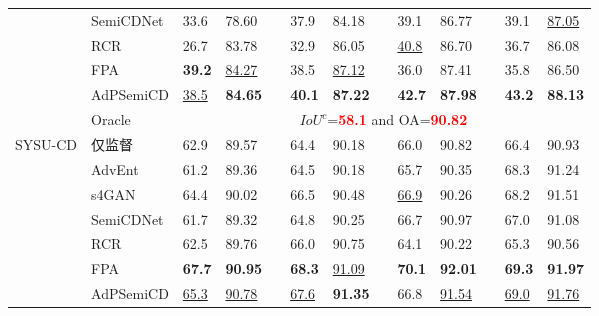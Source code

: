 \documentclass[lang=chs, degree=master, blindreview=false, adobe=false]{yanputhesis}
\begin{document}
\begin{table}[H]
{\begin{tabular}{p{20mm}p{25mm}p{8mm}p{8mm}cp{8mm}p{8mm}cp{8mm}p{8mm}cp{8mm}p{8mm}}
      & SemiCDNet\cite{peng2021SemiCDNet} & 33.6 & 78.60 && 37.9 & 84.18 && 39.1 & 86.77 && 39.1 & \underline{87.05} \\ %
      & RCR\cite{bandara2022RCR}& 26.7 & 83.78 && 32.9 & 86.05 && \underline{40.8} & 86.70 && 36.7 & 86.08 \\
      & FPA\cite{Zhang2023FPA}& \cellcolor{mycyan}\textbf{39.2} & \underline{84.27} && 38.5 & \underline{87.12} && 36.0 & 87.41 && 35.8 & 86.50 \\
      \rowcolor{mycyan}
      \multirow{-8}{*}{\cellcolor{white}}& \cellcolor{white}AdPSemiCD   &   \cellcolor{white}\underline{38.5} & \textbf{84.65} && \textbf{40.1} & \textbf{87.22} && \textbf{42.7} & \textbf{87.98} && \cellcolor{mycyan}\textbf{43.2} & \cellcolor{mycyan}\textbf{88.13} \\%
      \cline{2-13}
      & Oracle & \multicolumn{11}{c}{$ IoU^c$=\textcolor{red}{\bf 58.1} and OA=\textcolor{red}{\bf 90.82}} \\
      \bottomrule
      \multirow{8}{*}{SYSU-CD}
      & 仅监督   &   62.9 & 89.57 && 64.4 & 90.18 && 66.0 & 90.82 && 66.4 & 90.93 \\ %
      & AdvEnt\cite{vu2019advent}& 61.2 & 89.36 && 64.5 & 90.18 && 65.7 & 90.35 && 68.3 & 91.24 \\ %
      & s4GAN\cite{mittal2019semi}& 64.4 & 90.02 && 66.5 & 90.48 && \cellcolor{white}\underline{66.9} & 90.26 && 68.2 & 91.51 \\
      & SemiCDNet\cite{peng2021SemiCDNet} & 61.7 & 89.32 && 64.8 & 90.25 && 66.7 & 90.97 && 67.0 & 91.08 \\ %
      & RCR\cite{bandara2022RCR}& 62.5 & 89.76 && 66.0 & 90.75 && 64.1 & 90.22 && 65.3 & 90.56 \\
      & FPA\cite{Zhang2023FPA}& \cellcolor{mycyan}\textbf{67.7} &\cellcolor{mycyan}\textbf{90.95} &\cellcolor{mycyan}& \cellcolor{mycyan}\textbf{68.3} & \underline{91.09} && \cellcolor{mycyan}\textbf{70.1} & \cellcolor{mycyan}\textbf{92.01} &\cellcolor{mycyan}& \cellcolor{mycyan}\textbf{69.3} & \cellcolor{mycyan}\textbf{91.97} \\
      \multirow{-8}{*}{\cellcolor{white}}& \cellcolor{white}AdPSemiCD   &   \cellcolor{white}\underline{65.3} & \cellcolor{white}\underline{90.78} && \cellcolor{white}\underline{67.6} & \cellcolor{mycyan}\textbf{91.35} &\cellcolor{mycyan}& 66.8 & \cellcolor{white}\underline{91.54} && \cellcolor{white}\underline{69.0} & \cellcolor{white}\underline{91.76} \\%

\end{tabular}}
\end{table}
\end{document}
